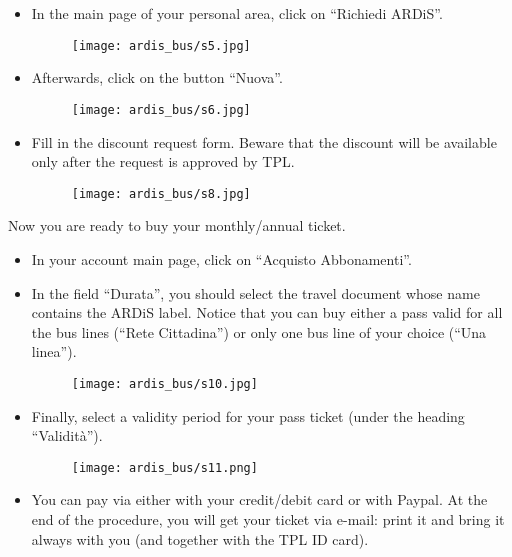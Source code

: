 \documentclass{sissavademecum}
\begin{document}
\begin{itemize}
    \item In the main page of your personal area, click on ``Richiedi ARDiS''.
    \begin{figure}[H]
        \begin{center}
            \texttt{[image: ardis\_bus/s5.jpg]}
        \end{center}
    \end{figure}
    \item Afterwards, click on the button ``Nuova''.
    \begin{figure}[H]
        \begin{center}
            \texttt{[image: ardis\_bus/s6.jpg]}
        \end{center}
    \end{figure}
    \item Fill in the discount request form. Beware that the discount will be available only after the request is approved by TPL.
    \begin{figure}[H]
        \begin{center}
            \texttt{[image: ardis\_bus/s8.jpg]}
        \end{center}
    \end{figure}
\end{itemize}

Now you are ready to buy your monthly/annual ticket.

\begin{itemize}
    \item In your account main page, click on ``Acquisto Abbonamenti''.
    \item In the field ``Durata'', you should select the travel document whose name contains the ARDiS label. Notice that you can buy either a pass valid for all the bus lines (``Rete Cittadina'') or only one bus line of your choice (``Una linea'').
    \begin{figure}[H]
        \begin{center}
            \texttt{[image: ardis\_bus/s10.jpg]}
        \end{center}
    \end{figure}
    \item Finally, select a validity period for your pass ticket (under the heading ``Validità'').
    \begin{figure}[H]
        \begin{center}
            \texttt{[image: ardis\_bus/s11.png]}
        \end{center}
    \end{figure}
    \item You can pay via either with your credit/debit card or with Paypal. At the end of the procedure, you will get your ticket via e-mail: print it and bring it always with you (and together with the TPL ID card).
\end{itemize}
\end{document}
